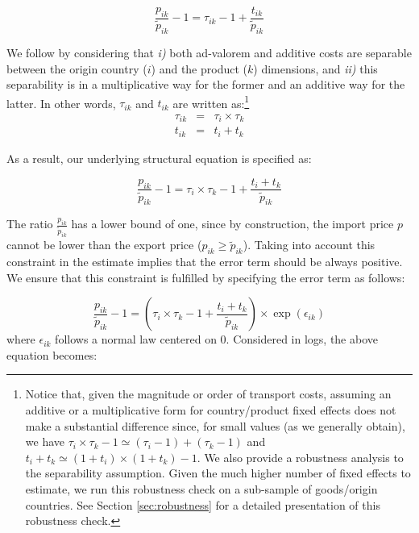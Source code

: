 \documentclass[a4paper,11pt]{article}
\begin{document}
\begin{equation}
\frac{p_{ik}}{\widetilde{p}_{ik}} -1 = \tau_{ik}-1 +\frac{t_{ik}}{ \widetilde{p}_{ik}} \label{eq:base_estimee}
\end{equation}

We follow \cite{Irrazabal_2015} by considering that \textit{i)} both ad-valorem and additive costs are separable between the origin country ($i$) and the product ($k$) dimensions, and \textit{ii)} this separability is in a multiplicative way for the former and an additive way for the latter.
In other words, $\tau_{ik}$ and $t_{ik}$ are written as:\footnote{Notice that, given the magnitude or order of transport costs, assuming an additive or a multiplicative form for country/product fixed effects does not make a substantial difference since, for small values (as we generally obtain), we have $\tau_i\times \tau_k -1\simeq (\tau_i-1) + (\tau_k -1) $ and $t_i+t_k\simeq (1+t_i)\times(1+t_k)-1$.
We also provide a robustness analysis to the separability assumption. Given the much higher number of fixed effects to estimate, we run this robustness check on a sub-sample of goods/origin countries. See Section \ref{sec:robustness} for a detailed presentation of this robustness check.}
\begin{eqnarray}
\tau_{ik} &=& \tau_{i} \times\tau_{k} \label{eq:ad-valorem}\\
t_{ik} &=& t_{i} + t_{k} \label{eq:add}
\end{eqnarray}

\noindent As a result, our underlying structural equation is specified as:

\begin{equation*}
\frac{p_{ik}}{\widetilde{p}_{ik}}-1 =\tau_{i}\times\tau_{k} -1 +\frac{t_{i} + t_{k}}{ \widetilde{p}_{ik}} \label{eq:theory_equation}
\end{equation*}

The ratio $\frac{p_{ik}}{\widetilde{p}_{ik}}$ has a lower bound of one, since by construction, the import price $p$ cannot be lower than the export price ($p_{ik}\geq\widetilde{p}_{ik}$). Taking into account this constraint in the estimate implies that the error term should be always positive.
We ensure that this constraint is fulfilled by specifying the error term as follows:

\begin{equation*}
\frac{p_{ik}}{\widetilde{p}_{ik}}-1 =\left(\tau_{i}\times \tau_{k} -1+\frac{t_{i} + t_{k}}{\widetilde{p}_{ik}} \right)\times \exp(\epsilon_{ik})
\end{equation*}
\noindent where $\epsilon_{ik}$ follows a normal law centered on 0.
Considered in logs, the above equation becomes:
\end{document}
